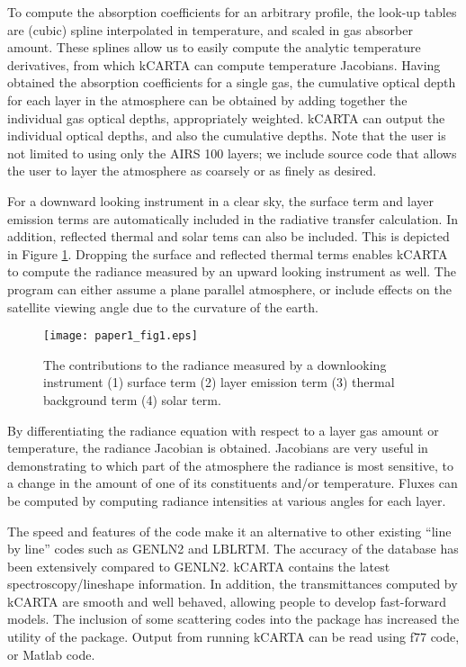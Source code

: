 \documentclass[11pt]{article}
\begin{document}
To compute the absorption coefficients for an arbitrary profile, the look-up 
tables are (cubic) spline interpolated in temperature, and scaled in gas 
absorber amount.  These splines allow us to easily compute the analytic 
temperature derivatives, from which \textsf{kCARTA} can compute temperature 
Jacobians. Having obtained the absorption coefficients for a single gas, the 
cumulative optical depth for each layer in the atmosphere
can be obtained by adding together the individual gas optical depths, 
appropriately weighted. \textsf{kCARTA} can output the individual optical 
depths, and also the cumulative depths. Note that the user is not limited to
using only the AIRS 100 layers; we include source code that allows the user 
to layer the atmosphere as coarsely or as finely as desired. 

For a downward looking instrument in a clear sky, the surface term and layer 
emission terms are automatically included in the radiative transfer 
calculation.  In addition, reflected thermal and solar tems can also be 
included. This is depicted in Figure \ref{fig:fig1}. Dropping the surface 
and reflected thermal terms enables \textsf{kCARTA} to compute the radiance 
measured by an upward looking instrument as well.  The program can either 
assume a plane parallel atmosphere, or include effects on the satellite 
viewing angle due to the curvature of the earth.

\begin{figure}
\texttt{[image: paper1\_fig1.eps]}
  \caption{The contributions to the radiance measured by a downlooking 
    instrument (1) surface term (2) layer emission term (3) thermal 
    background term (4) solar term.}
  \label{fig:fig1} 
\end{figure} 

By differentiating the radiance equation with respect to a layer gas
amount or temperature, the radiance Jacobian is obtained. Jacobians
are very useful in demonstrating to which part of the atmosphere the
radiance is most sensitive, to a change in the amount of one of
its constituents and/or temperature. Fluxes can be computed
by computing radiance intensities at various angles for each layer.

The speed and features of the code make it an alternative to other
existing ``line by line'' codes such as \textsf{GENLN2} and \textsf{LBLRTM}.
The accuracy of the database has been extensively compared to {\sf
GENLN2}. \textsf{kCARTA} contains the latest spectroscopy/lineshape 
information.  In addition, the transmittances computed by \textsf{kCARTA} are 
smooth and well behaved, allowing people to develop fast-forward models. The 
inclusion of some scattering codes into the package has increased the
utility of the package. Output from running \textsf{kCARTA} can be read using 
f77 code, or Matlab code. 
\end{document}
